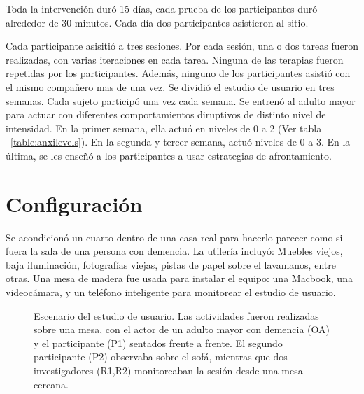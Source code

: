 Toda la intervenci\'on dur\'o 15 d\'ias, cada prueba de los participantes dur\'o alrededor de 30 minutos. Cada d\'ia dos participantes asistieron al sitio.

Cada participante asisiti\'o a tres sesiones. Por cada sesi\'on, una o dos tareas fueron realizadas, con varias iteraciones en cada tarea. Ninguna de las terapias fueron repetidas por los participantes. Adem\'as, ninguno de los participantes asisti\'o con el mismo compa\~nero mas de una vez. Se dividi\'o el estudio de usuario en tres semanas. Cada sujeto particip\'o una vez cada semana. Se entren\'o al adulto mayor para actuar con diferentes comportamientos diruptivos de distinto nivel de intensidad. En la primer semana, ella actu\'o en niveles de 0 a 2 (Ver tabla ~\ref{table:anxilevels}). En la segunda y tercer semana, actu\'o niveles de 0 a 3. En la \'ultima, se les ense\~n\'o a los participantes a usar estrategias de afrontamiento.
\section{Configuraci\'on}\label{secc:setup}
	Se acondicion\'o un cuarto dentro de una casa real para hacerlo parecer como si fuera la sala de una persona con demencia. La utiler\'ia incluy\'o: Muebles viejos, baja iluminaci\'on, fotograf\'ias viejas, pistas de papel sobre el lavamanos, entre otras. Una mesa de madera fue usada para instalar el equipo: una Macbook, una videoc\'amara, y un tel\'efono inteligente para monitorear el estudio de usuario.
\begin{figure}[h!]
        \centering
	\caption{Escenario del estudio de usuario. Las actividades fueron realizadas sobre una mesa, con el actor de un adulto mayor con demencia (OA) y el participante (P1) sentados frente a frente. El segundo participante (P2) observaba sobre el sof\'a, mientras que dos investigadores (R1,R2) monitoreaban la sesi\'on desde una mesa cercana.} \label{fig:img_exp_setup}
\end{figure}

